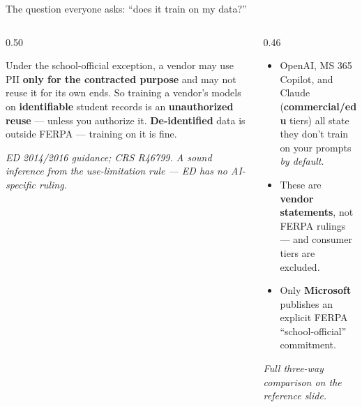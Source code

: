 \documentclass[aspectratio=169, 10pt]{beamer}
\newcommand{\cmcite}[1]{{\scriptsize\color{CoolGray}\textit{#1}}}
\begin{document}
\begin{frame}{The question everyone asks: ``does it train on my data?''}
\begin{columns}[T]
\begin{column}{0.50\textwidth}
\begin{tcolorbox}[keybox, title={\faBrain\quad The FERPA answer}, top=3pt, bottom=3pt]
\small
Under the school-official exception, a vendor may use PII \textbf{only for the contracted purpose} and may not reuse it for its own ends.
\vskip3pt
So training a vendor's models on \textbf{identifiable} student records is an \textbf{unauthorized reuse} --- unless you authorize it.
\vskip3pt
\textbf{De-identified} data is outside FERPA --- training on it is fine.
\end{tcolorbox}
\vskip3pt
\cmcite{ED 2014/2016 guidance; CRS R46799. A sound inference from the use-limitation rule --- ED has no AI-specific ruling.}
\end{column}
\begin{column}{0.46\textwidth}
\begin{tcolorbox}[coralbox, title={\faExclamationTriangle\quad The vendor reality}, top=2pt, bottom=2pt]
\small
\begin{itemize}\setlength{\itemsep}{1pt}
  \item OpenAI, MS 365 Copilot, and Claude (\textbf{commercial/edu} tiers) all state they don't train on your prompts \emph{by default}.
  \item These are \textbf{vendor statements}, not FERPA rulings --- and consumer tiers are excluded.
  \item Only \textbf{Microsoft} publishes an explicit FERPA ``school-official'' commitment.
\end{itemize}
\end{tcolorbox}
\vskip3pt
\cmcite{Full three-way comparison on the reference slide.}
\end{column}
\end{columns}
\end{frame}
\end{document}
